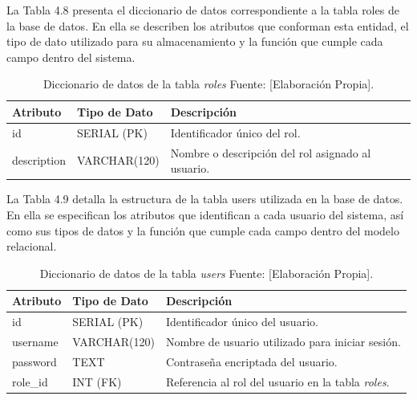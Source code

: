 La Tabla 4.8 presenta el diccionario de datos correspondiente a la tabla roles de la base de datos. En ella se describen los atributos que conforman esta entidad, el tipo de dato utilizado para su almacenamiento y la función que cumple cada campo dentro del sistema.
\begin{table}[H]
\centering
\caption{Diccionario de datos de la tabla \textit{roles} Fuente: [Elaboración Propia].}
\begin{tabular}{|l|l|p{7.4cm}|}
\hline
\textbf{Atributo} & \textbf{Tipo de Dato} & \textbf{Descripción} \\ \hline
id & SERIAL (PK) & Identificador único del rol. \\ \hline
description & VARCHAR(120) & Nombre o descripción del rol asignado al usuario. \\ \hline
\end{tabular}
\end{table}

La Tabla 4.9 detalla la estructura de la tabla users utilizada en la base de datos. En ella se especifican los atributos que identifican a cada usuario del sistema, así como sus tipos de datos y la función que cumple cada campo dentro del modelo relacional.
\begin{table}[H]
\centering
\caption{Diccionario de datos de la tabla \textit{users} Fuente: [Elaboración Propia].}
\begin{tabular}{|l|l|p{7.5cm}|}
\hline
\textbf{Atributo} & \textbf{Tipo de Dato} & \textbf{Descripción} \\ \hline
id & SERIAL (PK) & Identificador único del usuario. \\ \hline
username & VARCHAR(120) & Nombre de usuario utilizado para iniciar sesión. \\ \hline
password & TEXT & Contraseña encriptada del usuario. \\ \hline
role\_id & INT (FK) & Referencia al rol del usuario en la tabla \textit{roles}. \\ \hline
\end{tabular}
\end{table}

